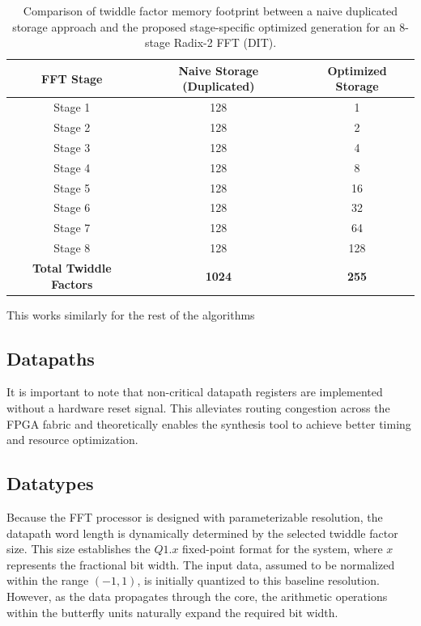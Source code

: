 \begin{table}[htbp]
    \centering
    \caption{Comparison of twiddle factor memory footprint between a naive duplicated storage approach and the proposed stage-specific optimized generation for an 8-stage Radix-2 FFT (DIT).}
    \vspace{0.5em}
    \begin{tabular}{|c|c|c|}
        \hline
        \textbf{FFT Stage} & \textbf{Naive Storage (Duplicated)} & \textbf{Optimized Storage} \\
        \hline
        Stage 1 & 128 & 1 \\
        Stage 2 & 128 & 2 \\
        Stage 3 & 128 & 4 \\
        Stage 4 & 128 & 8 \\
        Stage 5 & 128 & 16 \\
        Stage 6 & 128 & 32 \\
        Stage 7 & 128 & 64 \\
        Stage 8 & 128 & 128 \\
        \hline
        \textbf{Total Twiddle Factors} & \textbf{1024} & \textbf{255} \\
        \hline
    \end{tabular}
    \label{tab:twiddle_memory_comparison}
\end{table}

This works similarly for the rest of the algorithms

\subsection{Datapaths}
It is important to note that non-critical datapath registers are implemented without a hardware reset signal. This alleviates routing congestion across the FPGA fabric and theoretically enables the synthesis tool to achieve better timing and resource optimization.

\subsection{Datatypes}
Because the FFT processor is designed with parameterizable resolution, the datapath word length is dynamically determined by the selected twiddle factor size. This size establishes the $Q1.x$ fixed-point format for the system, where $x$ represents the fractional bit width. The input data, assumed to be normalized within the range $(-1, 1)$, is initially quantized to this baseline resolution. However, as the data propagates through the core, the arithmetic operations within the butterfly units naturally expand the required bit width.

